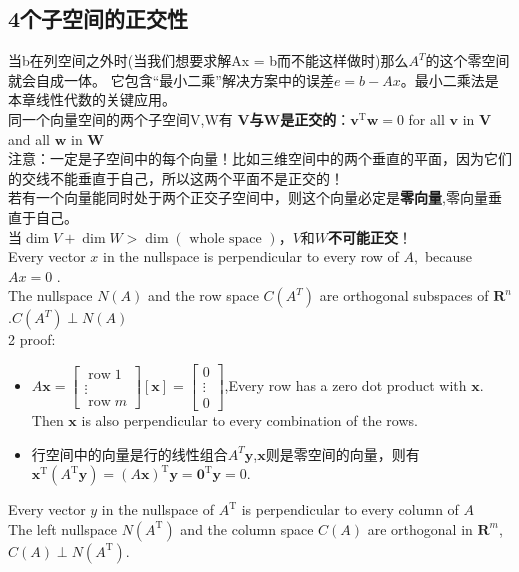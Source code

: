 \documentclass[UTF8]{article}
\begin{document}
    \subsection{4个子空间的正交性}
    当b在列空间之外时(当我们想要求解Ax = b而不能这样做时)那么$A^T$的这个零空间就会自成一体。 它包含“最小二乘”解决方案中的误差$e = b-Ax$。最小二乘法是本章线性代数的关键应用。
    \\
    同一个向量空间的两个子空间V,W有 \textbf{V与W是正交的}：$\boldsymbol{v}^{\mathrm{T}} \boldsymbol{w}=0$ for all $\boldsymbol{v}$ in $\boldsymbol{V}$ and all $\boldsymbol{w}$ in $\boldsymbol{W}$
    \\
    注意：一定是子空间中的每个向量！比如三维空间中的两个垂直的平面，因为它们的交线不能垂直于自己，所以这两个平面不是正交的！
    \\
    若有一个向量能同时处于两个正交子空间中，则这个向量必定是\textbf{零向量},零向量垂直于自己。\\
    当$\operatorname{dim} V+\operatorname{dim} W>\operatorname{dim}(\text { whole space })$，$V$和$W$\textbf{不可能正交}！
    \\
    Every vector $x$ in the nullspace is perpendicular to every row of $A,$ because $A x=0$ .\\
    The nullspace $N(A)$ and the row space $C\left(A^{T}\right)$ are orthogonal subspaces of $\mathbf{R}^{n}$ .$C(A^T) \perp N\left(A \right)$
    \\
    2 proof:
    \begin{itemize}
        \item $A \boldsymbol{x}=\left[\begin{array}{c}{\operatorname{row} 1} \\ {\vdots} \\ {\operatorname{row} m}\end{array}\right][\boldsymbol{x}]=\left[\begin{array}{c}{0} \\ {\vdots} \\ {0}\end{array}\right]$,Every row has a zero dot product with $\bm{x}$. Then $\bm{x}$ is also perpendicular
to every combination of the rows.
        \item 行空间中的向量是行的线性组合$A^T\bm{y}$,\quad $\bm{x}$则是零空间的向量，则有$\boldsymbol{x}^{\mathrm{T}}\left(A^{\mathrm{T}} \boldsymbol{y}\right)=(A \boldsymbol{x})^{\mathrm{T}} \boldsymbol{y}=\mathbf{0}^{\mathrm{T}} \boldsymbol{y}=0$.
    \end{itemize}
    Every vector $y$ in the nullspace of $A^{\mathrm{T}}$ is perpendicular to every column of $A$\\
    The left nullspace $N\left(A^{\mathrm{T}}\right)$ and the column space $C(A)$ are orthogonal in $\mathbf{R}^{m}$, $C(A) \perp N\left(A^{\mathrm{T}}\right)$.
    \\
\end{document}
